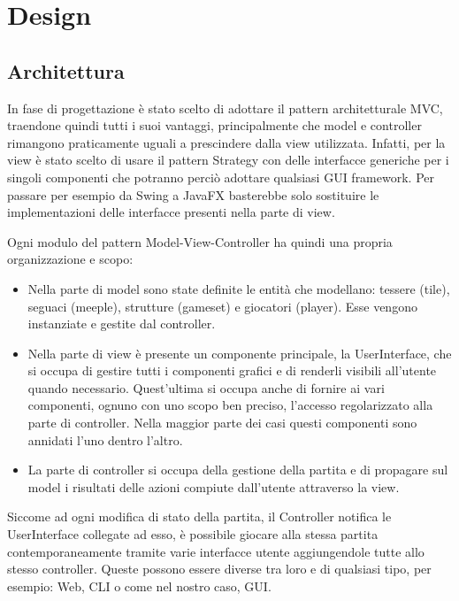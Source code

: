 \section{Design}
\subsection{Architettura}
In fase di progettazione è stato scelto di adottare il pattern architetturale MVC, traendone quindi tutti i suoi vantaggi, principalmente che model e controller rimangono praticamente uguali a prescindere dalla view utilizzata. Infatti, per la view è stato scelto di usare il pattern Strategy con delle interfacce generiche per i singoli componenti che potranno perciò adottare qualsiasi GUI framework. Per passare per esempio da Swing a JavaFX basterebbe solo sostituire le implementazioni delle interfacce presenti nella parte di view.
\medskip

Ogni modulo del pattern Model-View-Controller ha quindi una propria organizzazione e scopo:
\begin{itemize}
    \item Nella parte di model sono state definite le entità che modellano: tessere (tile), seguaci (meeple), strutture (gameset) e giocatori (player). Esse vengono instanziate e gestite dal controller.
    \item Nella parte di view è presente un componente principale, la UserInterface, che si occupa di gestire tutti i componenti grafici e di renderli visibili all'utente quando necessario. Quest'ultima si occupa anche di fornire ai vari componenti, ognuno con uno scopo ben preciso, l'accesso regolarizzato alla parte di controller. Nella maggior parte dei casi questi componenti sono annidati l'uno dentro l'altro.
    \item La parte di controller si occupa della gestione della partita e di propagare sul model i risultati delle azioni compiute dall'utente attraverso la view.
\end{itemize}
Siccome ad ogni modifica di stato della partita, il Controller notifica le UserInterface collegate ad esso, è possibile giocare alla stessa partita contemporaneamente tramite varie interfacce utente aggiungendole tutte allo stesso controller. Queste possono essere diverse tra loro e di qualsiasi tipo, per esempio: Web, CLI o come nel nostro caso, GUI.

